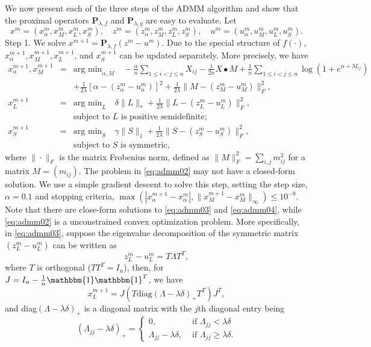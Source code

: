\documentclass{article}
\begin{document}
We now present each of the three steps of the ADMM algorithm and show that the proximal
operators $\mathbf{P}_{\lambda,f}$ and $\mathbf{P}_{\lambda,g}$ are easy to evaluate.
Let
$$
x^m = (x^m_\alpha, x^m_M, x^m_L, x^m_S), \quad
z^m = (z^m_\alpha, z^m_M, z^m_L, z^m_S), \quad
u^m = (u^m_\alpha, u^m_M, u^m_L, u^m_S).
$$
Step 1. We solve $x^{m+1} = \mathbf{P}_{\lambda,f}(z^m - u^m)$.
Due to the special structure of $f(\cdot)$,
$x^{m+1}_\alpha, x^{m+1}_M, x^{m+1}_L$, and $x^{m+1}_S$
can be updated separately. More precisely, we have
\begin{eqnarray}
x^{m+1}_\alpha, x^{m+1}_M &=& \mbox{arg min}_{\alpha, M} \quad
-\frac{\alpha}{n} \sum_{1\le i< j\le n}X_{ij}
-\frac{1}{2n} X \bullet M
+ \frac{1}{n} \sum_{1\le i<j\le n} \log \left(1 + e^{\alpha + M_{ij}}\right) \nonumber \\
&& + \frac{1}{2\lambda}\left[\alpha - (z^m_\alpha - u^m_\alpha)\right]^2
+ \frac{1}{2\lambda}\|M - (z^m_M - u^m_M)\|^2_F, \label{eq:admm02} \\
x^{m+1}_L &=& \mbox{arg min}_{ L} \quad \delta \|L\|_\ast
+ \frac{1}{2\lambda}\|L - (z^m_L - u^m_L)\|^2_F,\label{eq:admm03}
\\
&& \mbox{subject to $L$ is positive semidefinite;} \nonumber \\
x^{m+1}_S &=& \mbox{arg min}_{ S} \quad  \gamma \|S\|_1
+ \frac{1}{2\lambda}\|S - (z^m_S - u^m_S)\|^2_F,
\label{eq:admm04}
\\
&& \mbox{subject to $S$ is symmetric,} \nonumber
\end{eqnarray}
where $\|\cdot\|_F$ is the matrix Frobenius norm, defined as
$\|M\|^2_F = \sum_{i,j} m^2_{ij}$ for a matrix $M = (m_{ij})$.
The problem in \eqref{eq:admm02} may not have a closed-form solution. We use a simple gradient descent to solve this step, setting the step size, $\alpha=0.1$ and stopping criteria, $\max(|x_\alpha^{m+1}-x_\alpha^{m}|,\|x_M^{m+1}-x_M^{m}\|_{\infty}) \leq 10^{-9}$. Note that there are close-form solutions to \eqref{eq:admm03} and \eqref{eq:admm04}, while \eqref{eq:admm02} is a unconstrained convex optimization problem. More specifically, in \eqref{eq:admm03}, suppose the eigenvalue decomposition of the symmetric matrix $(z^m_L - u^m_L)$ can be written as
$$
z^m_L - u^m_L = T \Lambda T^T,
$$
where $T$ is orthogonal ($T T^T = I_n$), then, for $J=I_{n}-\frac{1}{n}\mathbbm{1}\mathbbm{1}^T$, we have
$$
x^{m+1}_L = J (T \mbox{diag}(\Lambda-\lambda \delta)_+ T^T)J^{T},
$$
and diag$(\Lambda-\lambda \delta)_+$ is a diagonal matrix with the $j$th
diagonal entry being
$$
(\Lambda_{jj}-\lambda \delta)_+ = \left\{
\begin{array}{ll}
0, & \mbox{ if } \Lambda_{jj} < \lambda \delta \\
\Lambda_{jj}-\lambda \delta, & \mbox{ if } \Lambda_{jj} \ge \lambda \delta .
\end{array}
\right.
$$
\end{document}
